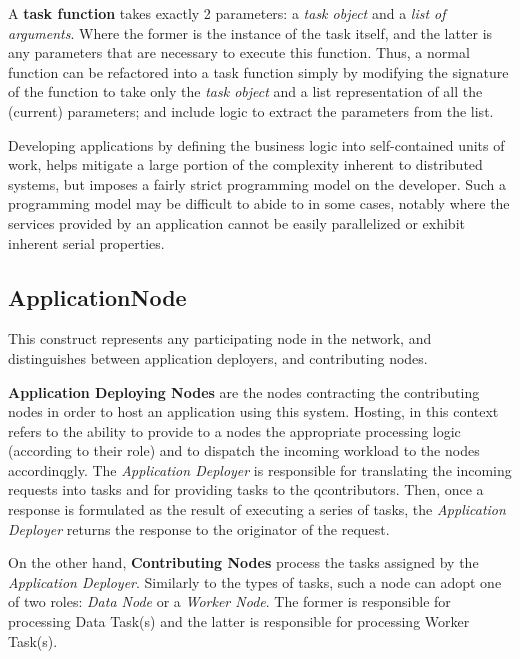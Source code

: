 \documentclass[12pt, titlepage]{uo_temp}
\begin{document}
     A \textbf{task function} takes exactly 2 parameters: a \emph{task object} and a
     \emph{list of arguments}. Where the former is the instance of the task itself, and
     the latter is any parameters that are necessary to execute this function. Thus, a
     normal function can be refactored into a task function simply by modifying the
     signature of the function to take only the \emph{task object} and a list
     representation of all the (current) parameters; and include logic to extract the
     parameters from the list.

     Developing applications by defining the business logic into self-contained units of
     work, helps mitigate a large portion of the complexity inherent to distributed
     systems, but imposes a fairly strict programming model on the developer. Such a
     programming model may be difficult to abide to in some cases, notably where the
     services provided by an application cannot be easily parallelized or exhibit inherent
     serial properties.

     \subsection{ApplicationNode}
     This construct represents any participating node in the network,
     and distinguishes between application deployers, and contributing nodes.

     \textbf{Application Deploying Nodes} are the nodes contracting the contributing nodes
     in order to host an application using this system. Hosting, in this context refers to
     the ability to provide to a nodes the appropriate processing logic (according to
     their role) and to dispatch the incoming workload to the nodes accordinqgly. The
     \emph{Application Deployer} is responsible for translating the incoming requests into
     tasks and for providing tasks to the qcontributors. Then, once a response is
     formulated as the result of executing a series of tasks, the \emph{Application
       Deployer} returns the response to the originator of the request.

     On the other hand, \textbf{Contributing Nodes} process the tasks assigned by the
     \emph{Application Deployer}. Similarly to the types of tasks, such a node can adopt
     one of two roles: \emph{Data Node} or a \emph{Worker Node}. The former is responsible
     for processing Data Task(s) and the latter is responsible for processing Worker
     Task(s).
    
\end{document}
